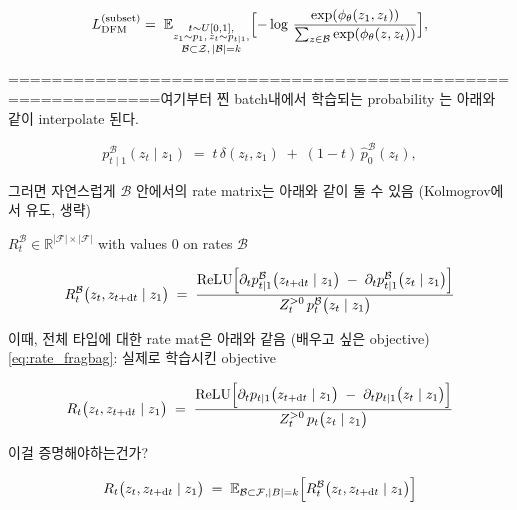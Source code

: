 \[
L_{\mathrm{DFM}}^{(\text{subset})}
=\;
\mathbb{E}_{ 
  \substack{
    t \sim U[0,1],\\
    z_1 \sim p_1,\,
    z_t \sim p_{t\mid 1},\\
    \mathcal{B}\subset \mathcal{Z},\,|\mathcal{B}|=k
  }
}
\Bigl[
  -\log\,
  \frac{
    \exp(\phi_\theta(z_1, z_t))
  }{
    \sum_{z \in \mathcal{B}}
    \exp(\phi_\theta(z, z_t))
  }
\Bigr],
\]


============================================================여기부터 찐
batch내에서 학습되는 probability 는 아래와 같이 interpolate 된다. 

\[
p_{t\mid 1}^\mathcal{B}(z_t \mid z_1)
\;=\;
t\,\delta(z_t, z_1)
\;+\;
(1 - t)\,\hat{p}_0^\mathcal{B}(z_t),
\] 

그러면 자연스럽게 $\mathcal{B}$ 안에서의 rate matrix는 아래와 같이 둘 수 있음 (Kolmogrov에서 유도, 생략)

$R_{t}^{\mathcal{B}}\in\mathbb{R}^{|\mathcal{F}| \times |\mathcal{F}|}$ with values $0$ on rates $\mathcal{B}$

\begin{equation} 
    R_{t}^{\mathcal{B}}\bigl(z_t, z_{t+\mathrm{d}t}\mid z_1\bigr)
    \;=\;
    \frac{\mathrm{ReLU}
    \Bigl[\partial_t p_{t|1}^{\mathcal{B}}\bigl(z_{t+\mathrm{d}t}\mid z_1\bigr)
    \;-\;
    \partial_t p_{t|1}^{\mathcal{B}}\bigl(z_t\mid z_1\bigr)\Bigr]}
    {Z^{>0}_t \, p_t^{\mathcal{B}}\bigl(z_t\mid z_1\bigr)}
    \label{eq:rate_fragbag}
\end{equation}

이때, 전체 타입에 대한 rate mat은 아래와 같음 (배우고 싶은 objective) \cref{eq:rate_fragbag}: 실제로 학습시킨 objective

\begin{equation}
    R_{t}\bigl(z_t, z_{t+\mathrm{d}t}\mid z_1\bigr)
    \;=\;
    \frac{\mathrm{ReLU}
    \Bigl[\partial_t p_{t|1}\bigl(z_{t+\mathrm{d}t}\mid z_1\bigr)
    \;-\;
    \partial_t p_{t|1}\bigl(z_t\mid z_1\bigr)\Bigr]}
    {Z^{>0}_t \, p_t\bigl(z_t\mid z_1\bigr)}
    \label{eq:rate_full}
\end{equation}


이걸 증명해야하는건가?

\begin{equation}
    R_{t}\bigl(z_t, z_{t+\mathrm{d}t}\mid z_1\bigr)
    \;=\;
    \mathbb{E}_{\mathcal{B}\subset\mathcal{F}, |B|=k} 
    \Bigl[R_{t}^{\mathcal{B}}\bigl(z_t, z_{t+\mathrm{d}t}\mid z_1\bigr)\Bigr]
    \label{eq:rate_full_expect}
\end{equation}












